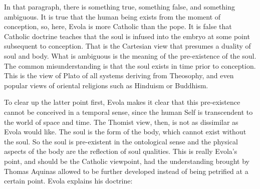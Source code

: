 In that paragraph, there is something true, something false, and something ambiguous. It is true that the human being exists from the moment of conception, so, here, Evola is more Catholic than the pope. It is false that Catholic doctrine teaches that the soul is infused into the embryo at some point subsequent to conception. That is the Cartesian view that presumes a duality of soul and body. What is ambiguous is the meaning of the pre-existence of the soul. The common misunderstanding is that the soul exists in time prior to conception. This is the view of Plato of all systems deriving from Theosophy, and even popular views of oriental religions such as Hinduism or Buddhism.

To clear up the latter point first, Evola makes it clear that this pre-existence cannot be conceived in a temporal sense, since the human Self is transcendent to the world of space and time. The Thomist view, then, is not as dissimilar as Evola would like. The soul is the form of the body, which cannot exist without the soul. So the soul is pre-existent in the ontological sense and the physical aspects of the body are the reflection of soul qualities. This is really Evola's point, and should be the Catholic viewpoint, had the understanding brought by Thomas Aquinas allowed to be further developed instead of being petrified at a certain point. Evola explains his doctrine:

